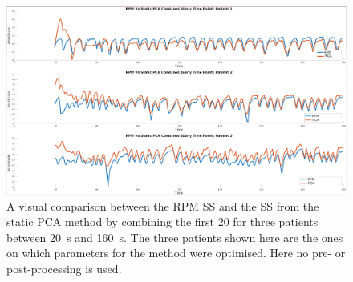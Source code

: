             \begin{figure}
                \centering
                
                \includegraphics[width=1.0\linewidth]{figures/data_driven_surrogate_signal_extraction_results_1_combined_surrogate_signal.png}
                
                \captionsetup{singlelinecheck=false, justification=centering}
                \caption{A visual comparison between the \gls{RPM} \gls{SS} and the \gls{SS} from the static \gls{PCA} method by combining the first $20$  for three patients between \SI{20}{\second} and \SI{160}{\second}. The three patients shown here are the ones on which parameters for the method were optimised. Here no pre- or post-processing is used.}
                \label{fig:pca_data_driven_surrogate_signal_extraction_methods_for_dynamic_pet_results_combined_surrogate_signal}
            \end{figure}
            
